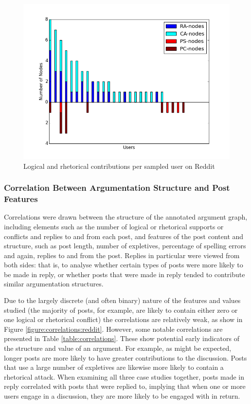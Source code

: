 \begin{figure}
\centering
\includegraphics[scale=\scaleResults]{./figures/rhetoric_per_user/reddit.png}
\caption{Logical and rhetorical contributions per sampled user on Reddit}
\label{figure:rhetoricuser:reddit}
\end{figure}

\subsubsection{Correlation Between Argumentation Structure and Post Features}
Correlations were drawn between the structure of the annotated argument graph, including elements such as the number of logical or rhetorical supports or conflicts and replies to and from each post, and features of the post content and structure, such as post length, number of expletives, percentage of spelling errors and again, replies to and from the post. Replies in particular were viewed from both sides: that is, to analyse whether certain types of posts were more likely to be made in reply, or whether posts that were made in reply tended to contribute similar argumentation structures.

Due to the largely discrete (and often binary) nature of the features and values studied (the majority of posts, for example, are likely to contain either zero or one logical or rhetorical conflict) the correlations are relatively weak, as show in Figure \ref{figure:correlations:reddit}. However, some notable correlations are presented in Table \ref{table:correlations}. These show potential early indicators of the structure and value of an argument. For example, as might be expected, longer posts are more likely to have greater contributions to the discussion. Posts that use a large number of expletives are likewise more likely to contain a rhetorical attack. When examining all three case studies together, posts made in reply correlated with posts that were replied to, implying that when one or more users engage in a discussion, they are more likely to be engaged with in return.


